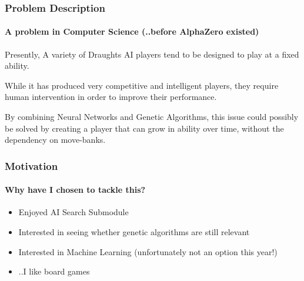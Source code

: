 \documentclass[aspectratio=169]{beamer}
\begin{document}
\begin{frame}
  \frametitle{Problem Description}
	\framesubtitle{A problem in Computer Science (..before AlphaZero existed)}
	\setlength{\parskip}{1.5em}

	Presently, A variety of Draughts AI players tend to be designed to play at a fixed ability.
	\par
	While it has produced very competitive and intelligent players, they require human  intervention in order to improve their performance.
	\par
	By combining Neural Networks and Genetic Algorithms, this issue could possibly be solved by creating a player that can grow in ability over time, without the dependency on move-banks.


\end{frame}

\begin{frame}
	\frametitle{Motivation}
	\framesubtitle{Why have I chosen to tackle this?}

	\begin{itemize}
		\item Enjoyed AI Search Submodule
		\item Interested in seeing whether genetic algorithms are still relevant
		\item Interested in Machine Learning (unfortunately not an option this year!)
		\item ..I like board games
	\end{itemize}

\end{frame}
\end{document}
